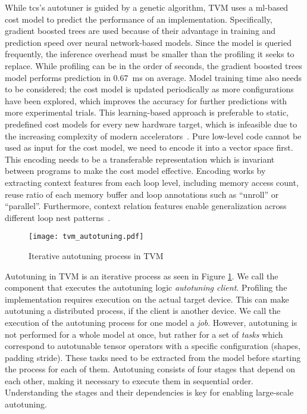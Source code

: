 While \glspl{tc}'s autotuner is guided by a genetic algorithm, TVM uses a \gls{ml}-based cost model to predict the performance of an implementation. Specifically, gradient boosted trees are used because of their advantage in training and prediction speed over neural network-based models. Since the model is queried frequently, the inference overhead must be smaller than the profiling it seeks to replace. While profiling can be in the order of seconds, the gradient boosted trees model performs prediction in \SI{0.67}{\milli\second} on average. Model training time also needs to be considered; the cost model is updated periodically as more configurations have been explored, which improves the accuracy for further predictions with more experimental trials. This learning-based approach is preferable to static, predefined cost models for every new hardware target, which is infeasible due to the increasing complexity of modern accelerators~\cite[p.~8~f.]{Chen.2018b}. Pure low-level code cannot be used as input for the cost model, we need to encode it into a vector space first. This encoding needs to be a transferable representation which is invariant between programs to make the cost model effective. Encoding works by extracting context features from each loop level, including memory access count, reuse ratio of each memory buffer and loop annotations such as \enquote{unroll} or \enquote{parallel}. Furthermore, context relation features enable generalization across different loop nest patterns~\cite[p.~4]{Chen.2018}.

\begin{figure}
	\centering
	\texttt{[image: tvm\_autotuning.pdf]}%
	\caption{Iterative autotuning process in TVM}
	\label{fig:tvm-autotuning}
\end{figure}

Autotuning in TVM is an iterative process as seen in Figure \ref{fig:tvm-autotuning}. We call the component that executes the autotuning logic \textit{autotuning client}. Profiling the implementation requires execution on the actual target device. This can make autotuning a distributed process, if the client is another device. We call the execution of the autotuning process for one model a \textit{job}. However, autotuning is not performed for a whole model at once, but rather for a set of \textit{tasks} which correspond to autotunable tensor operators with a specific configuration (shapes, padding stride). These tasks need to be extracted from the model before starting the process for each of them. Autotuning consists of four stages that depend on each other, making it necessary to execute them in sequential order. Understanding the stages and their dependencies is key for enabling large-scale autotuning.

